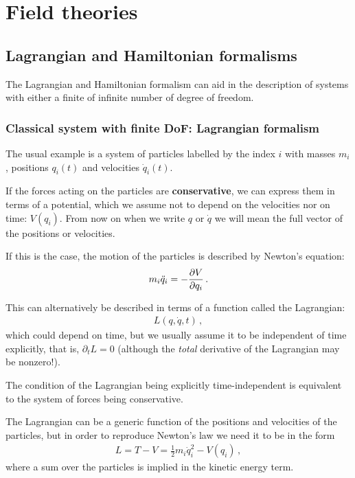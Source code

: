 \documentclass[main.tex]{subfiles}
\begin{document}
\chapter{Field theories}

\section{Lagrangian and Hamiltonian formalisms}


The Lagrangian and Hamiltonian formalism can aid in the description of systems with either a finite of infinite number of degree of freedom. 

\subsection{Classical system with finite DoF: Lagrangian formalism}

The usual example is a system of particles labelled by the index \(i\) with masses \(m_i\), positions \(q_i (t)\) and velocities \(\dot{q}_{i}(t)\).

If the forces acting on the particles are \textbf{conservative}, we can express them in terms of a potential, which we assume not to depend on the velocities nor on time: \(V(q_{i})\).
From now on when we write \(q\) or \(\dot{q}\) we will mean the full vector of the positions or velocities.

If this is the case, the motion of the particles is described by Newton's equation: 
%
\begin{align}
m_i \ddot{q}_{i} = - \pdv{V}{q_{i}}
\,.
\end{align}

This can alternatively be described in terms of a function called the Lagrangian: 
%
\begin{align}
L(q, \dot{q}, t)
\,,
\end{align}
%
which could depend on time, but we usually assume it to be independent of time explicitly, that is, \(\partial_{t} L = 0\) (although the \emph{total} derivative of the Lagrangian may be nonzero!).

The condition of the Lagrangian being explicitly time-independent is equivalent to the system of forces being conservative.

The Lagrangian can be a generic function of the positions and velocities of the particles, but in order to reproduce Newton's law we need it to be in the form 
%
\begin{align}
L = T-V = \frac{1}{2} m_i \dot{q}_i^2 - V(q_i)
\,,
\end{align}
%
where a sum over the particles is implied in the kinetic energy term.
\end{document}
